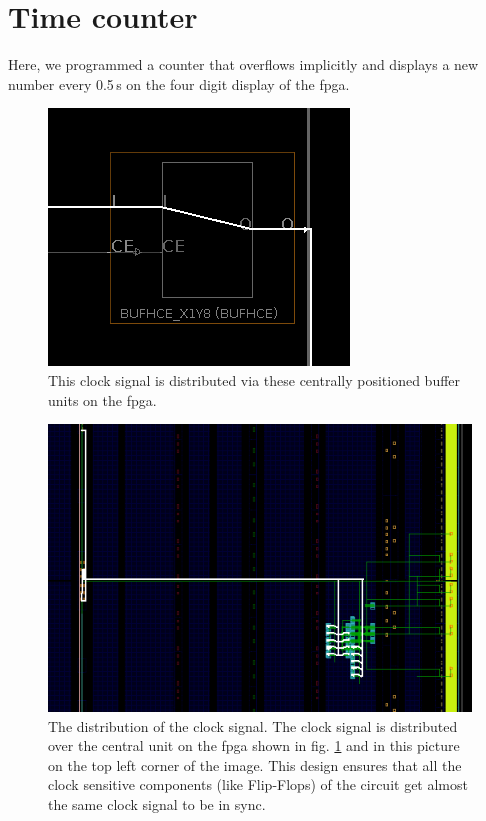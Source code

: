 \section{Time counter}

Here, we programmed a counter that overflows implicitly and displays a new number every 0.5\,s on the four digit display of the \gls{fpga}. 

\begin{figure}[h]
	\centering
	\includegraphics[width=.6\linewidth]{./L3/E3/BUFHCE.png}
	\caption{This clock signal is distributed via these centrally positioned buffer units on the \gls{fpga}.} 
	\label{fig: clock  e_3_3_1}
\end{figure}

\begin{figure}[h]
	\centering
	\includegraphics[width=.8\linewidth]{./L3/E3/CLK.png}
	\caption{The distribution of the clock signal. The clock signal is distributed over the central unit on the \gls{fpga} shown in fig. \ref*{fig: clock  e_3_3_1} and in this picture on the top left corner of the image. This design ensures that all the clock sensitive components (like Flip-Flops) of the circuit get almost the same clock signal to be in sync.}
	\label{fig: clock routing e_3_3_1}
\end{figure}

